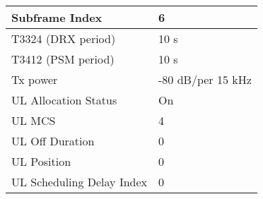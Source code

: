 \begin{longtable}{|p{8cm}|p{5cm}|}
Subframe Index                                          & 6                  \\ \hline
T3324 (DRX period)                                      & 10 s               \\ \hline
T3412 (PSM period)                                      & 10 s               \\ \hline
Tx power                                                & -80 dB/per 15 kHz  \\ \hline
UL Allocation Status                                    & On                 \\ \hline
UL MCS                                                  & 4                  \\ \hline
UL Off Duration                                         & 0                  \\ \hline
UL Position                                             & 0                  \\ \hline
UL Scheduling Delay Index                               & 0                  \\ \hline
\end{longtable}
